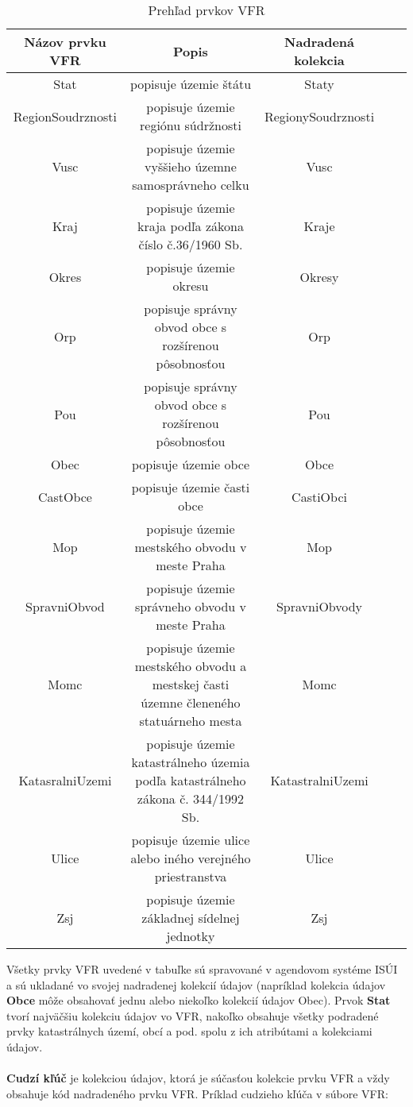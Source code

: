 \begin{table}[H]
\centering
\caption{Prehľad prvkov VFR}
\label{prvkyVfr}
\resizebox{\textwidth}{100pt} {
\begin{tabular}{|c|c|c|c|c|}
\hline Názov prvku VFR & Popis & Nadradená kolekcia \\ \hline
Stat & popisuje územie štátu & Staty \\
RegionSoudrznosti & popisuje územie regiónu súdržnosti & RegionySoudrznosti\\
Vusc & popisuje územie vyššieho územne samosprávneho celku & Vusc\\
Kraj & popisuje územie kraja podľa zákona číslo č.36/1960 Sb. & Kraje \\
Okres & popisuje územie okresu & Okresy\\
Orp & popisuje správny obvod obce s rozšírenou pôsobnosťou & Orp\\
Pou & popisuje správny obvod obce s rozšírenou pôsobnosťou & Pou\\
Obec & popisuje územie obce & Obce\\
CastObce & popisuje územie časti obce & CastiObci\\
Mop & popisuje územie mestského obvodu v meste Praha & Mop \\
SpravniObvod & popisuje územie správneho obvodu v meste Praha & SpravniObvody\\
Momc & popisuje územie mestského obvodu a mestskej časti územne členeného statuárneho mesta & Momc\\
KatasralniUzemi & popisuje územie katastrálneho územia podľa  katastrálneho zákona č. 344/1992 Sb. & KatastralniUzemi\\
Ulice & popisuje územie ulice alebo iného verejného priestranstva & Ulice\\
Zsj & popisuje územie základnej sídelnej jednotky & Zsj\\ \hline
\end{tabular}
}
\end{table}
Všetky prvky VFR uvedené v tabuľke sú spravované v agendovom systéme ISÚI a sú ukladané vo svojej nadradenej kolekcií údajov (napríklad kolekcia údajov {\bf Obce} môže obsahovať jednu alebo niekoľko kolekcií údajov Obec). Prvok {\bf Stat} tvorí najväčšiu kolekciu údajov vo VFR, nakoľko obsahuje všetky podradené prvky katastrálnych území, obcí a pod. spolu z ich atribútami a kolekciami údajov. \\ \\
{\bf Cudzí kľúč} je kolekciou údajov, ktorá je súčasťou kolekcie prvku VFR a vždy obsahuje kód nadradeného prvku VFR. Príklad cudzieho kľúča v súbore VFR:

